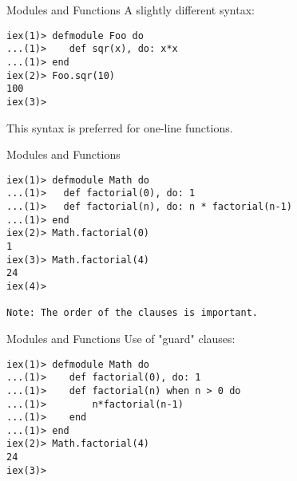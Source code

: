 \documentclass{beamer}
\begin{document}
\begin{frame}[fragile]{Modules and Functions}
A slightly different syntax:
\begin{verbatim}
iex(1)> defmodule Foo do
...(1)>    def sqr(x), do: x*x
...(1)> end
iex(2)> Foo.sqr(10)
100
iex(3)>
\end{verbatim}
This syntax is preferred for one-line functions.
\end{frame}
\begin{frame}[fragile]{Modules and Functions}

\begin{verbatim}
iex(1)> defmodule Math do
...(1)>   def factorial(0), do: 1
...(1)>   def factorial(n), do: n * factorial(n-1)
...(1)> end
iex(2)> Math.factorial(0)
1
iex(3)> Math.factorial(4)
24
iex(4)> 

Note: The order of the clauses is important.
\end{verbatim}
\end{frame}

\begin{frame}[fragile]{Modules and Functions}
Use of "guard" clauses:
\begin{verbatim}
iex(1)> defmodule Math do
...(1)>    def factorial(0), do: 1
...(1)>    def factorial(n) when n > 0 do 
...(1)>        n*factorial(n-1)
...(1)>    end
...(1)> end
iex(2)> Math.factorial(4)
24
iex(3)>

\end{verbatim}
\end{frame}
\end{document}
